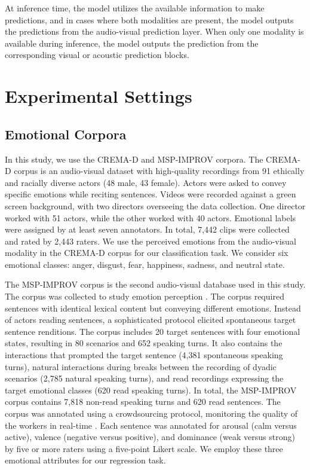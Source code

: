 \documentclass{article}
\begin{document}
At inference time, the model utilizes the available information to make predictions, and in cases where both modalities are present, the model outputs the predictions from the audio-visual prediction layer. When only one modality is available during inference, the model outputs the prediction from the corresponding visual or acoustic prediction blocks.
  

\section{Experimental Settings}
\label{sec:experiments}

\subsection{Emotional Corpora}
\label{ssec:corpora}

In this study, we use the CREMA-D \cite{Cao_2014_2} and MSP-IMPROV \cite{Busso_2017} corpora. The CREMA-D corpus is an audio-visual dataset with high-quality recordings from 91 ethically and racially diverse actors (48 male, 43 female). Actors were asked to convey specific emotions while reciting sentences. Videos were recorded against a green screen background, with two directors overseeing the data collection. One director worked with 51 actors, while the other worked with 40 actors. Emotional labels were assigned by at least seven annotators. In total, 7,442 clips were collected and rated by 2,443 raters. We use the perceived emotions from the audio-visual modality in the CREMA-D corpus for our classification task. We consider six emotional classes: anger, disgust, fear, happiness, sadness, and neutral state.

The MSP-IMPROV corpus \cite{Busso_2017} is the second audio-visual database used in this study. The corpus was collected to study emotion perception \cite{Mower-Provost_2015}. The corpus required sentences with identical lexical content but conveying different emotions. Instead of actors reading sentences, a sophisticated protocol elicited spontaneous target sentence renditions. The corpus includes 20 target sentences with four emotional states, resulting in 80 scenarios and 652 speaking turns. It also contains the interactions that prompted the target sentence (4,381 spontaneous speaking turns), natural interactions during breaks between the recording of dyadic scenarios (2,785 natural speaking turns), and read recordings expressing the target emotional classes (620 read speaking turns). In total, the MSP-IMPROV corpus contains 7,818 non-read speaking turns and 620 read sentences. The corpus was annotated using a crowdsourcing protocol, monitoring the quality of the workers in real-time \cite{Burmania_2016_2}. Each sentence was annotated for arousal (calm versus active), valence (negative versus positive), and dominance (weak versus strong) by five or more raters using a five-point Likert scale. We employ these three emotional attributes for our regression task.
\end{document}

